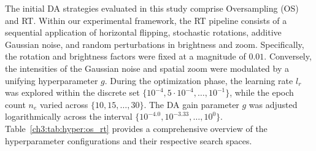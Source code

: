 The initial DA strategies evaluated in this study comprise Oversampling (OS) and RT. Within our experimental framework, the RT pipeline consists of a sequential application of horizontal flipping, stochastic rotations, additive Gaussian noise, and random perturbations in brightness and zoom.
Specifically, the rotation and brightness factors were fixed at a magnitude of $0.01$. 
Conversely, the intensities of the Gaussian noise and spatial zoom were modulated by a unifying hyperparameter $g$. 
During the optimization phase, the learning rate $l_r$ was explored within the discrete set $\{10^{-4}, 5 \cdot 10^{-4}, \dots, 10^{-1}\}$, while the epoch count $n_e$ varied across $\{10, 15, \dots, 30\}$. The DA gain parameter $g$ was adjusted logarithmically across the interval $\{10^{-4.0}, 10^{-3.33}, \dots, 10^{0}\}$.
Table~\ref{ch3:tab:hyper:os_rt} provides a comprehensive overview of the hyperparameter configurations and their respective search spaces.

